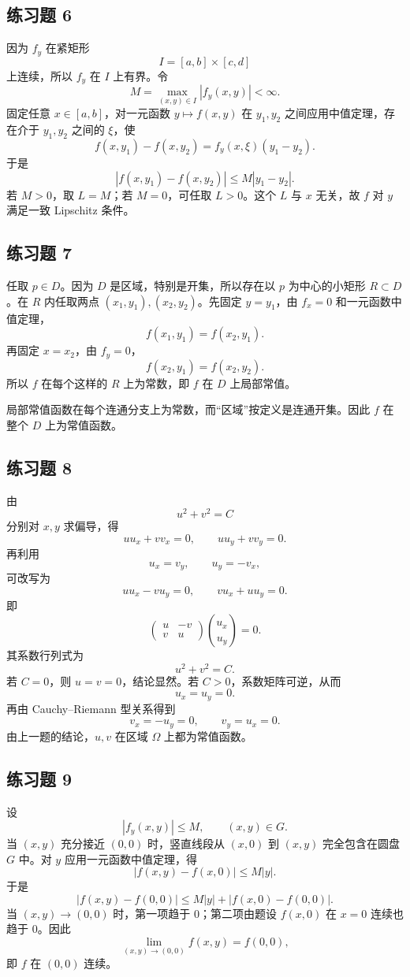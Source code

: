 \subsection*{练习题 6}
\begin{xsolution}
因为 $f_y$ 在紧矩形
\[
  I=[a,b]\times[c,d]
\]
上连续，所以 $f_y$ 在 $I$ 上有界。令
\[
  M=\max_{(x,y)\in I}|f_y(x,y)|<\infty.
\]
固定任意 $x\in[a,b]$，对一元函数 $y\mapsto f(x,y)$ 在 $y_1,y_2$ 之间应用中值定理，存在介于 $y_1,y_2$ 之间的 $\xi$，使
\[
  f(x,y_1)-f(x,y_2)=f_y(x,\xi)(y_1-y_2).
\]
于是
\[
  |f(x,y_1)-f(x,y_2)|
  \le M|y_1-y_2|.
\]
若 $M>0$，取 $L=M$；若 $M=0$，可任取 $L>0$。这个 $L$ 与 $x$ 无关，故 $f$ 对 $y$ 满足一致 Lipschitz 条件。
\end{xsolution}

\subsection*{练习题 7}
\begin{xsolution}
任取 $p\in D$。因为 $D$ 是区域，特别是开集，所以存在以 $p$ 为中心的小矩形 $R\subset D$。在 $R$ 内任取两点 $(x_1,y_1),(x_2,y_2)$。先固定 $y=y_1$，由 $f_x=0$ 和一元函数中值定理，
\[
  f(x_1,y_1)=f(x_2,y_1).
\]
再固定 $x=x_2$，由 $f_y=0$，
\[
  f(x_2,y_1)=f(x_2,y_2).
\]
所以 $f$ 在每个这样的 $R$ 上为常数，即 $f$ 在 $D$ 上局部常值。

局部常值函数在每个连通分支上为常数，而“区域”按定义是连通开集。因此 $f$ 在整个 $D$ 上为常值函数。
\end{xsolution}

\subsection*{练习题 8}
\begin{xsolution}
由
\[
  u^2+v^2=C
\]
分别对 $x,y$ 求偏导，得
\[
  u u_x+v v_x=0,
  \qquad
  u u_y+v v_y=0.
\]
再利用
\[
  u_x=v_y,
  \qquad
  u_y=-v_x,
\]
可改写为
\[
  u u_x-v u_y=0,
  \qquad
  v u_x+u u_y=0.
\]
即
\[
  \begin{pmatrix}
    u&-v\\
    v&u
  \end{pmatrix}
  \binom{u_x}{u_y}=0.
\]
其系数行列式为
\[
  u^2+v^2=C.
\]
若 $C=0$，则 $u=v=0$，结论显然。若 $C>0$，系数矩阵可逆，从而
\[
  u_x=u_y=0.
\]
再由 Cauchy--Riemann 型关系得到
\[
  v_x=-u_y=0,
  \qquad
  v_y=u_x=0.
\]
由上一题的结论，$u,v$ 在区域 $\Omega$ 上都为常值函数。
\end{xsolution}

\subsection*{练习题 9}
\begin{xsolution}
设
\[
  |f_y(x,y)|\le M,
  \qquad (x,y)\in G.
\]
当 $(x,y)$ 充分接近 $(0,0)$ 时，竖直线段从 $(x,0)$ 到 $(x,y)$ 完全包含在圆盘 $G$ 中。对 $y$ 应用一元函数中值定理，得
\[
  |f(x,y)-f(x,0)|\le M|y|.
\]
于是
\[
  |f(x,y)-f(0,0)|
  \le M|y|+|f(x,0)-f(0,0)|.
\]
当 $(x,y)\to(0,0)$ 时，第一项趋于 $0$；第二项由题设 $f(x,0)$ 在 $x=0$ 连续也趋于 $0$。因此
\[
  \lim_{(x,y)\to(0,0)}f(x,y)=f(0,0),
\]
即 $f$ 在 $(0,0)$ 连续。
\end{xsolution}

